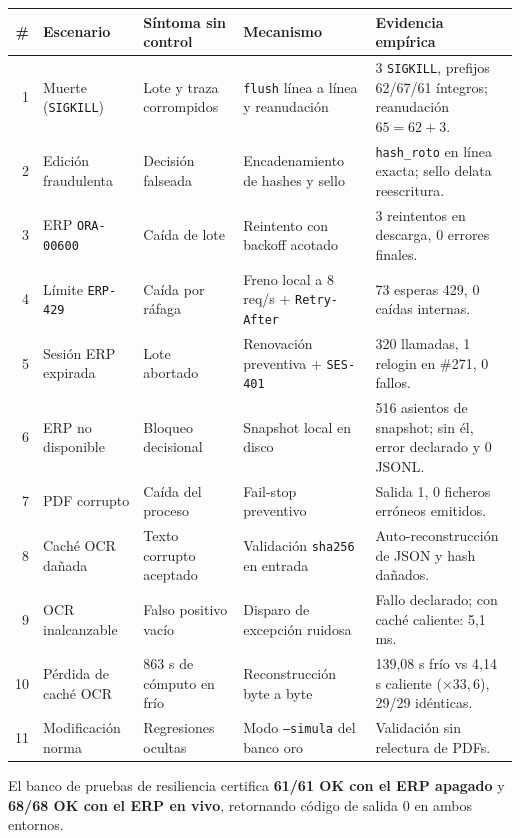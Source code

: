 \documentclass[11pt,a4paper]{article}
\begin{document}
\begin{longtable}{r p{} p{} p{} p{}}
\toprule
\# & Escenario & Síntoma sin control & Mecanismo & Evidencia empírica \\
\midrule
\endhead
1 & Muerte (\texttt{SIGKILL}) & Lote y traza corrompidos & \texttt{flush} línea a línea y reanudación & 3 \texttt{SIGKILL}, prefijos 62/67/61 íntegros; reanudación $65 = 62 + 3$. \\
2 & Edición fraudulenta & Decisión falseada & Encadenamiento de hashes y sello & \texttt{hash\_roto} en línea exacta; sello delata reescritura. \\
3 & ERP \texttt{ORA-00600} & Caída de lote & Reintento con backoff acotado & 3 reintentos en descarga, 0 errores finales. \\
4 & Límite \texttt{ERP-429} & Caída por ráfaga & Freno local a 8 req/s + \texttt{Retry-After} & 73 esperas 429, 0 caídas internas. \\
5 & Sesión ERP expirada & Lote abortado & Renovación preventiva + \texttt{SES-401} & 320 llamadas, 1 relogin en \#271, 0 fallos. \\
6 & ERP no disponible & Bloqueo decisional & Snapshot local en disco & 516 asientos de snapshot; sin él, error declarado y 0 JSONL. \\
7 & PDF corrupto & Caída del proceso & Fail-stop preventivo & Salida 1, 0 ficheros erróneos emitidos. \\
8 & Caché OCR dañada & Texto corrupto aceptado & Validación \texttt{sha256} en entrada & Auto-reconstrucción de JSON y hash dañados. \\
9 & OCR inalcanzable & Falso positivo vacío & Disparo de excepción ruidosa & Fallo declarado; con caché caliente: 5,1 ms. \\
10 & Pérdida de caché OCR & 863 s de cómputo en frío & Reconstrucción byte a byte & 139,08 s frío vs 4,14 s caliente ($\times 33,6$), 29/29 idénticas. \\
11 & Modificación norma & Regresiones ocultas & Modo \texttt{--simula} del banco oro & Validación sin relectura de PDFs. \\
\bottomrule
\end{longtable}

El banco de pruebas de resiliencia certifica \textbf{61/61 OK con el ERP apagado} y \textbf{68/68 OK con el ERP en vivo}, retornando código de salida 0 en ambos entornos.
\end{document}

